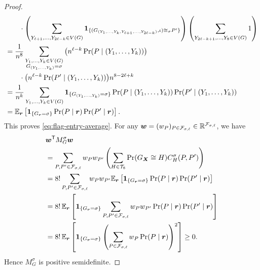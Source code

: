 \begin{proof}
\begin{align*}
&\qquad\cdot
\left(\sum_{Y_{\ell+1},\ldots,Y_{2\ell-k}\in V(G)}
\mathbf 1_{\{(G_{(Y_1,\ldots,Y_k,Y_{\ell+1},\ldots,Y_{2\ell-k})},\iota)
\cong_\sigma P'\}}\right)
\left(\sum_{Y_{2\ell-k+1},\ldots,Y_8\in V(G)}1\right)\\
&=\frac1{n^8}
\sum_{\substack{Y_1,\ldots,Y_k\in V(G)\\G_{(Y_1,\ldots,Y_k)}=\sigma}}
\big(n^{\ell-k}\Pr(P\mid(Y_1,\ldots,Y_k))\big)\\
&\qquad\cdot
\big(n^{\ell-k}\Pr(P'\mid(Y_1,\ldots,Y_k))\big)n^{8-2\ell+k}\\
&=\frac1{n^k}\sum_{Y_1,\ldots,Y_k\in V(G)}
\mathbf 1_{\{G_{(Y_1,\ldots,Y_k)}=\sigma\}}
\Pr(P\mid(Y_1,\ldots,Y_k))\Pr(P'\mid(Y_1,\ldots,Y_k))\\
&=\mathbb E_{\boldsymbol{r}}\left[\mathbf 1_{\{G_{\boldsymbol{r}}=\sigma\}}
\Pr(P\mid\boldsymbol{r})\Pr(P'\mid\boldsymbol{r})\right].
\end{align*}
This proves \eqref{eq:flag-entry-average}.
For any $\boldsymbol{w}=(w_P)_{P\in\mathcal F_{\sigma,\ell}}
\in\mathbb R^{\mathcal F_{\sigma,\ell}}$, we have
\begin{align*}
&\boldsymbol{w}^{\mathsf T}M_G^\sigma\boldsymbol{w}\\
&=\sum_{P,P'\in\mathcal F_{\sigma,\ell}}w_Pw_{P'}
\left(\sum_{H\in\mathcal T_8}
\Pr(G_{\boldsymbol{X}}\cong H)C_H^\sigma(P,P')\right)\\
&=8!\sum_{P,P'\in\mathcal F_{\sigma,\ell}}w_Pw_{P'}
\mathbb E_{\boldsymbol{r}}\left[\mathbf 1_{\{G_{\boldsymbol{r}}=\sigma\}}
\Pr(P\mid\boldsymbol{r})\Pr(P'\mid\boldsymbol{r})\right]\\
&=8!\,\mathbb E_{\boldsymbol{r}}\left[\mathbf 1_{\{G_{\boldsymbol{r}}=\sigma\}}
\sum_{P,P'\in\mathcal F_{\sigma,\ell}}
w_Pw_{P'}\Pr(P\mid\boldsymbol{r})\Pr(P'\mid\boldsymbol{r})\right]\\
&=8!\,\mathbb E_{\boldsymbol{r}}\left[\mathbf 1_{\{G_{\boldsymbol{r}}=\sigma\}}
\left(\sum_{P\in\mathcal F_{\sigma,\ell}}
w_P\Pr(P\mid\boldsymbol{r})\right)^2\right]\geq0.
\end{align*}
Hence $M_G^\sigma$ is positive semidefinite.
\end{proof}
